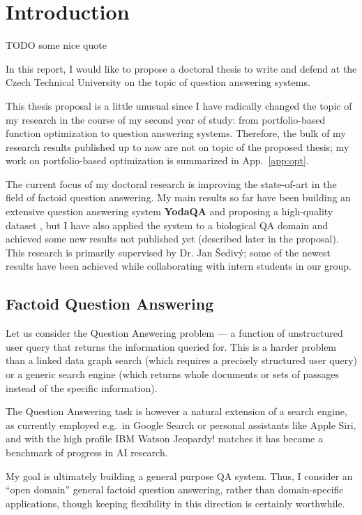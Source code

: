 \chapter{Introduction}
\label{ch:intro}

TODO some nice quote

In this report, I would like to propose a doctoral thesis to write
and defend at the Czech Technical University on the topic of question
answering systems.

This thesis proposal is a little unusual since I have radically changed
the topic of my research in the course of my second year of study:
from portfolio-based function optimization to question answering systems.
Therefore, the bulk of my research results published up to now are not
on topic of the proposed thesis; my work on portfolio-based optimization
is summarized in App.~\ref{app:opt}.

The current focus of my doctoral research
is improving the state-of-art in the field of factoid question answering.
My main results so far have been
building an extensive question answering system \textbf{YodaQA} \citep{YodaQAPoster2015}
and proposing a high-quality dataset \citep{YodaQACLEF2015},
but I have also applied the system to a biological QA domain \citep{YodaQABioASQ2015}
and achieved some new results not published yet (described later in the proposal).
This research is primarily supervised by Dr. Jan Šedivý;
some of the newest results have been achieved while collaborating
with intern students in our group.

\section{Factoid Question Answering}

Let us consider the Question Answering problem --- a function of
unstructured user query that returns the information queried for.
This is a harder problem than a linked data graph search (which requires
a precisely structured user query) or a generic search engine (which
returns whole documents or sets of passages instead of the specific
information).

The Question Answering task is however a natural extension of a search
engine, as currently employed e.g.\ in Google Search \citep{googleKG}
or personal assistants like Apple Siri, and with the high
profile IBM Watson Jeopardy! matches \citep{WatsonOverview}
it has became a benchmark of progress in AI research.

My goal is ultimately building a general purpose QA system.
Thus, I consider an ``open domain'' general factoid question answering,
rather than domain-specific applications, though keeping flexibility
in this direction is certainly worthwhile.

